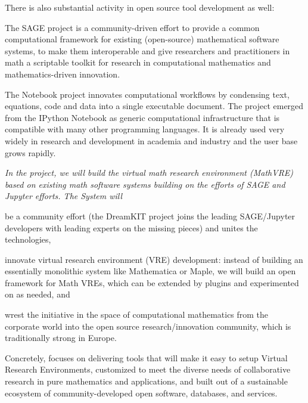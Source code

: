 \documentclass[noworkareas,deliverables,keys]{euproposal}                  %
\begin{document}
\begin{proposal}
There is also substantial activity in open source tool development as well:
\begin{compactitem}
\item The SAGE project is a community-driven effort to provide a common computational
  framework for existing (open-source) mathematical software systems, to make them
  interoperable and give researchers and practitioners in math a scriptable toolkit for
  research in computational mathematics and mathematics-driven innovation.
\item The \Jupyter{} Notebook project innovates computational workflows by condensing text, equations, code and data into a single executable document. The \Jupyter project emerged from the IPython Notebook as generic computational infrastructure that is compatible with many other programming languages. It is already used very widely in research and development in academia and industry and the user base grows rapidly. 
\end{compactitem}
\begin{center}
\begin{boxedminipage}{.95\textwidth}\em 
In the \TheProject project, we will build the virtual math research environment (MathVRE) based
on existing math software systems building on the efforts of SAGE and Jupyter efforts. The
\TheProject System will
\begin{compactenum}[\em i)\rm]
\item be a community effort (the DreamKIT project joins the leading SAGE/Jupyter
  developers with leading experts on the missing pieces) 
  and unites the technologies,
\item innovate virtual research environment (VRE) development: instead of building an essentially monolithic system like
  Mathematica or Maple, we will build an open framework for Math VREs, which can be
  extended by plugins and experimented on as needed, and
\item wrest the initiative in the space of computational mathematics from the corporate
  world into the open source research/innovation community, which is traditionally strong in Europe.
\end{compactenum}
\end{boxedminipage}
\end{center}

Concretely, \TheProject focuses on delivering tools that will make it easy to setup
Virtual Research Environments, customized to meet the diverse needs of collaborative
research in pure mathematics and applications, and built out of a sustainable ecosystem
of %
community-developed open software, databases, and services.


\end{proposal}
\end{document}

